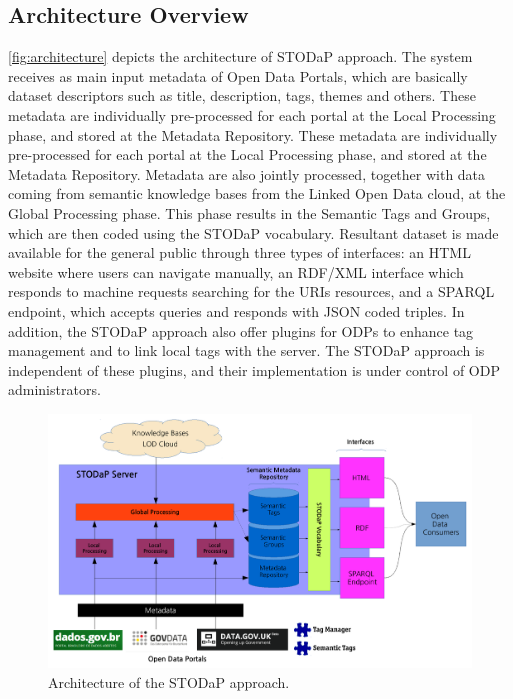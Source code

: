 \subsection{Architecture Overview}
\label{sec:stodap_architecture_overview}

\autoref{fig:architecture} depicts the architecture of STODaP approach.
The system receives as main input metadata of Open Data Portals, which are basically dataset descriptors such as title, description, tags, themes and others.
These metadata are individually pre-processed for each portal at the Local Processing phase, and stored at the Metadata Repository.
These metadata are individually pre-processed for each portal at the Local Processing phase, and stored at the Metadata Repository.
Metadata are also jointly processed, together with data coming from semantic knowledge bases from the Linked Open Data cloud, at the Global Processing phase.
This phase results in the Semantic Tags and Groups, which are then coded using the STODaP vocabulary.
Resultant dataset is made available for the general public through three types of interfaces: an HTML website where users can navigate manually, an RDF/XML interface which responds to machine requests searching for the URIs resources, and a SPARQL endpoint, which accepts queries and responds with JSON coded triples.
In addition, the STODaP approach also offer plugins for ODPs to enhance tag management and to link local tags with the server.
The STODaP approach is independent of these plugins, and their implementation is under control of ODP administrators.

\begin{figure}[t]
\begin{center}
\includegraphics[width=\columnwidth]{images/architecture.pdf}
\caption[Architecture of the STODaP approach.]{Architecture of the STODaP approach.}
\label{fig:architecture}
\end{center}
\end{figure}

